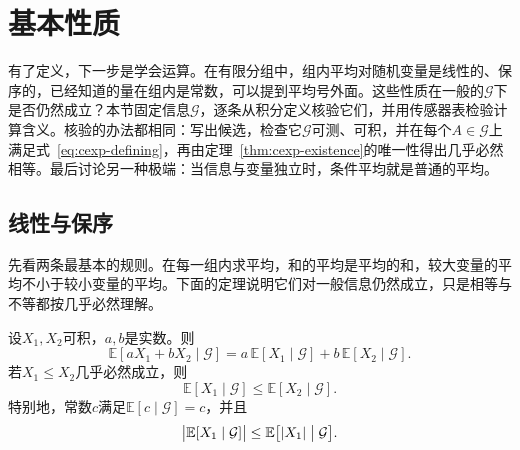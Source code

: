 \section{基本性质}
\label{sec:cexp-properties}

有了定义，下一步是学会运算。在有限分组中，组内平均对随机变量是线性的、保序的，已经知道的量在组内是常数，可以提到平均号外面。这些性质在一般的$\mathcal{G}$下是否仍然成立？本节固定信息$\mathcal{G}$，逐条从积分定义核验它们，并用传感器表检验计算含义。核验的办法都相同：写出候选，检查它$\mathcal{G}$可测、可积，并在每个$A\in\mathcal{G}$上满足式~\eqref{eq:cexp-defining}，再由定理~\ref{thm:cexp-existence}的唯一性得出几乎必然相等。最后讨论另一种极端：当信息与变量独立时，条件平均就是普通的平均。

\subsection{线性与保序}
\label{sec:cexp-linearity}

先看两条最基本的规则。在每一组内求平均，和的平均是平均的和，较大变量的平均不小于较小变量的平均。下面的定理说明它们对一般信息仍然成立，只是相等与不等都按几乎必然理解。

\begin{theorem}[线性与保序]
\label{thm:cexp-linearity}
设$X_1,X_2$可积，$a,b$是实数。则
\begin{equation}
 \mathbb{E}[aX_1+bX_2\mid\mathcal{G}]=a\,\mathbb{E}[X_1\mid\mathcal{G}]+b\,\mathbb{E}[X_2\mid\mathcal{G}].
 \label{eq:cexp-linearity}
\end{equation}
若$X_1\leq X_2$几乎必然成立，则
\begin{equation}
 \mathbb{E}[X_1\mid\mathcal{G}]\leq\mathbb{E}[X_2\mid\mathcal{G}].
 \label{eq:cexp-monotone}
\end{equation}
特别地，常数$c$满足$\mathbb{E}[c\mid\mathcal{G}]=c$，并且
\begin{equation}
 \bigl\lvert\mathbb{E}[X_1\mid\mathcal{G}]\bigr\rvert\leq\mathbb{E}\bigl[\lvert X_1\rvert\bigm|\mathcal{G}\bigr].
 \label{eq:cexp-abs}
\end{equation}
\end{theorem}

